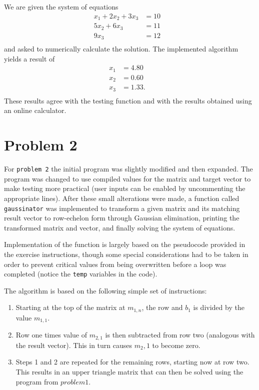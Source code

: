 \documentclass[12pt]{article}
\begin{document}
We are given the system of equations
\begin{align*}
	x_{1} + 2 x_{2} + 3 x_{3} & =  10 &\\
	5 x_{2} + 6 x_{3} & =  11 &\\
	9 x_{3} & =  12 &\\
\end{align*}
and asked to numerically calculate the solution. The implemented algorithm yields a result of 
\begin{align*}
	x_{1} & =  4.80 &\\
	x_{2} & =  0.60 &\\
	x_{3} & =  1.33. &\\
\end{align*}
These results agree with the testing function and with the results obtained using an online calculator. 

\section{Problem 2}
\label{sec:problem2}

For \texttt{problem 2} the initial program was slightly modified and then expanded. The program was changed to use compiled values for the matrix and target vector to make testing more practical (user inputs can be enabled by uncommenting the appropriate lines). After these small alterations were made, a function called \texttt{gaussinator} was implemented to transform a given matrix and its matching result vector to row-echelon form through Gaussian elimination, printing the transformed matrix and vector, and finally solving the system of equations. 

Implementation of the function is largely based on the pseudocode provided in the exercise instructions, though some special considerations had to be taken in order to prevent critical values from being overwritten before a loop was completed (notice the \texttt{temp} variables in the code). 

The algorithm is based on the following simple set of instructions:
\begin{enumerate}
	\item Starting at the top of the matrix at \(m_{1,n}\), the row and \(b_{1}\) is divided by the value \(m_{1,1}\). 
	\item Row one times value of \(m_{2,1}\) is then subtracted from row two (analogous with the result vector). This in turn causes \(m_2,1\) to become zero.
	\item Steps 1 and 2 are repeated for the remaining rows, starting now at row two. This results in an upper triangle matrix that can then be solved using the program from \(problem 1\). 
\end{enumerate}
\end{document}
